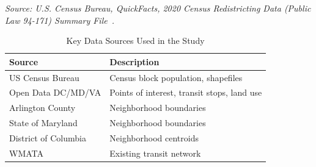 \documentclass[sigconf,nonacm]{acmart}
\begin{document}


\begin{table}[h]
\caption{Counties and County-Equivalents in the Study Area}
\label{tab:counties}
\end{table}

\noindent\textit{Source: U.S. Census Bureau, QuickFacts, 2020 Census Redistricting Data (Public Law 94-171) Summary File~\cite{lit:census}.} 


\begin{table}[h]
\caption{Key Data Sources Used in the Study}
\label{tab:datasources}
\begin{tabular}{ll}
\toprule
Source & Description \\
\midrule
US Census Bureau & Census block population, shapefiles \\
Open Data DC/MD/VA & Points of interest, transit stops, land use \\
Arlington County & Neighborhood boundaries \\
State of Maryland & Neighborhood boundaries \\
District of Columbia & Neighborhood centroids \\
WMATA & Existing transit network \\
\bottomrule
\end{tabular}
\end{table}
\end{document}
